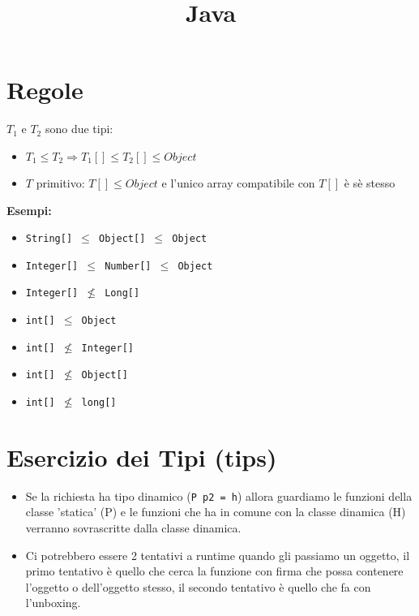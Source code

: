 \documentclass[10pt]{article}
\title{Java}
\author{}
\date{}
\begin{document}
\maketitle
{}
\section{Regole}
$T_{1} \text{ e } T_{2}$ sono due tipi:
\begin{itemize}
    \item $T_{1}\leq T_{2}\Rightarrow T_{1}[]\leq T_{2}[] \leq Object$
    \item $T$ primitivo: $T[]\leq Object$ e l'unico array compatibile con $T[]$ è sè stesso
\end{itemize}
\textbf{Esempi:}
\begin{itemize}
    \item \texttt{String[] $\leq$ Object[] $\leq$ Object}
    \item \texttt{Integer[] $\leq$ Number[] $\leq$ Object}
    \item \texttt{Integer[] $\nleq$ Long[]}
    \item \texttt{int[] $\leq$ Object}
    \item \texttt{int[] $\nleq$ Integer[]}
    \item \texttt{int[] $\nleq$ Object[]}
    \item \texttt{int[] $\nleq$ long[]}
\end{itemize}
\section{Esercizio dei Tipi (tips)}
\begin{itemize}
    \item Se la richiesta ha tipo dinamico (\texttt{P p2 = h}) allora guardiamo le funzioni della classe 'statica' (P) e le funzioni che ha in comune con la classe dinamica (H) verranno sovrascritte dalla classe dinamica.
    \item Ci potrebbero essere 2 tentativi a runtime quando gli passiamo un oggetto, il primo tentativo è quello che cerca la funzione con firma che possa contenere l'oggetto o dell'oggetto stesso, il secondo tentativo è quello che fa con l'unboxing.
\end{itemize}
\end{document}
